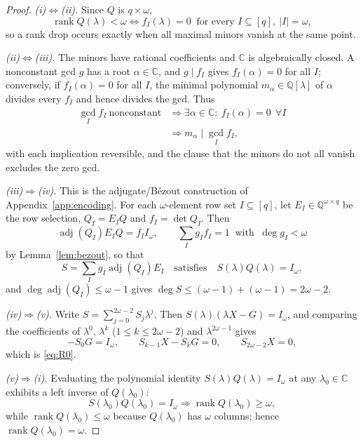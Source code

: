 \begin{proof}
\emph{(i)$\Leftrightarrow$(ii).} Since $Q$ is $q\times\omega$,
\begin{equation*}
\operatorname{rank}Q(\lambda)<\omega
\iff f_I(\lambda)=0\ \text{ for every } I\subseteq[q],\ |I|=\omega,
\end{equation*}
so a rank drop occurs exactly when all maximal minors vanish at the same point.

\emph{(ii)$\Leftrightarrow$(iii).} The minors have rational coefficients and
$\mathbb C$ is algebraically closed. A nonconstant gcd $g$ has a root
$\alpha\in\mathbb C$, and $g\mid f_I$ gives $f_I(\alpha)=0$ for all $I$;
conversely, if $f_I(\alpha)=0$ for all $I$, the minimal polynomial
$m_\alpha\in\mathbb Q[\lambda]$ of $\alpha$ divides every $f_I$ and hence
divides the gcd. Thus
\begin{equation*}
\begin{aligned}
\gcd_I f_I\ \text{nonconstant}
&\Longrightarrow\exists\alpha\in\mathbb C:\ f_I(\alpha)=0\ \ \forall I\\
&\Longrightarrow m_\alpha\mid\gcd_I f_I ,
\end{aligned}
\end{equation*}
with each implication reversible, and the clause that the minors do not all
vanish excludes the zero gcd.

\emph{(iii)$\Rightarrow$(iv).} This is the adjugate/B\'ezout construction of
Appendix~\ref{app:encoding}. For each $\omega$-element row set
$I\subseteq[q]$, let $E_I\in\mathbb Q^{\omega\times q}$ be the row selection,
$Q_I=E_IQ$ and $f_I=\det Q_I$. Then
\begin{equation*}
\operatorname{adj}(Q_I)E_IQ=f_II_\omega,\qquad
\sum_Ig_If_I=1\ \text{ with }\ \deg g_I<\omega
\end{equation*}
by Lemma~\ref{lem:bezout}, so that
\begin{equation*}
S=\sum_Ig_I\operatorname{adj}(Q_I)E_I
\quad\text{satisfies}\quad
S(\lambda)Q(\lambda)=I_\omega ,
\end{equation*}
and $\deg\operatorname{adj}(Q_I)\le\omega-1$ gives
$\deg S\le(\omega-1)+(\omega-1)=2\omega-2$.

\emph{(iv)$\Rightarrow$(v).} Write $S=\sum_{j=0}^{2\omega-2}S_j\lambda^j$. Then
$S(\lambda)(\lambda X-G)=I_\omega$, and comparing the coefficients of
$\lambda^0$, $\lambda^k$ ($1\le k\le2\omega-2$) and $\lambda^{2\omega-1}$ gives
\begin{equation*}
-S_0G=I_\omega,\qquad S_{k-1}X-S_kG=0,\qquad S_{2\omega-2}X=0,
\end{equation*}
which is \eqref{eq:R0}.

\emph{(v)$\Rightarrow$(i).} Evaluating the polynomial identity
$S(\lambda)Q(\lambda)=I_\omega$ at any $\lambda_0\in\mathbb C$ exhibits a left
inverse of $Q(\lambda_0)$:
\begin{equation*}
S(\lambda_0)Q(\lambda_0)=I_\omega
\Longrightarrow\operatorname{rank}Q(\lambda_0)\ge\omega,
\end{equation*}
while $\operatorname{rank}Q(\lambda_0)\le\omega$ because $Q(\lambda_0)$ has
$\omega$ columns; hence $\operatorname{rank}Q(\lambda_0)=\omega$.
\end{proof}


